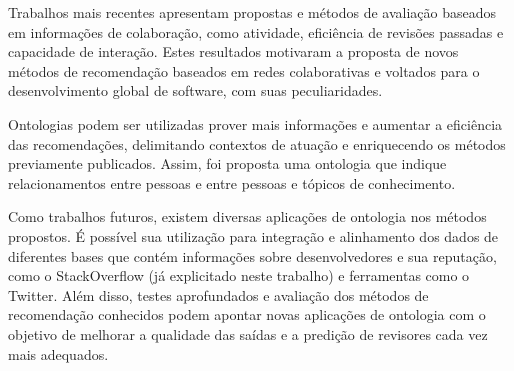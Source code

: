 \documentclass[a4paper,12pt]{monografia}
\theoremstyle{plain}
\theoremstyle{definition}
\theoremstyle{remark}
\begin{document}
Trabalhos mais recentes apresentam propostas e métodos de avaliação baseados em informações de colaboração, como atividade, eficiência de revisões passadas e capacidade de interação. Estes resultados motivaram a proposta de novos métodos de recomendação baseados em redes colaborativas e voltados para o desenvolvimento global de software, com suas peculiaridades.

Ontologias podem ser utilizadas prover mais informações e aumentar a eficiência das recomendações, delimitando contextos de atuação e enriquecendo os métodos previamente publicados. Assim, foi proposta uma ontologia que indique relacionamentos entre pessoas e entre pessoas e tópicos de conhecimento.

Como trabalhos futuros, existem diversas aplicações de ontologia nos métodos propostos. É possível sua utilização para integração e alinhamento dos dados de diferentes bases que contém informações sobre desenvolvedores e sua reputação, como o StackOverflow (já explicitado neste trabalho) e ferramentas como o Twitter. Além disso, testes aprofundados e avaliação dos métodos de recomendação conhecidos podem apontar novas aplicações de ontologia com o objetivo de melhorar a qualidade das saídas e a predição de revisores cada vez mais adequados.

\singlespacing



\end{document}
